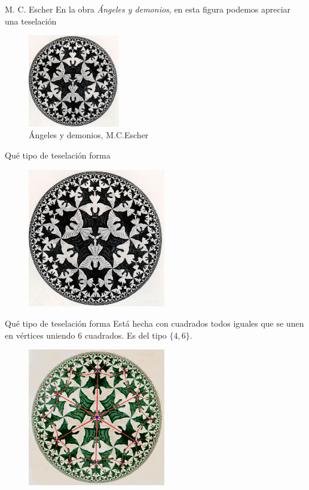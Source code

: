 \documentclass[compress]{beamer}
\begin{document}
\begin{frame}{M. C. Escher}
  En la obra \textit{Ángeles y demonios}, en esta figura podemos
  apreciar una teselación

  \begin{figure}[ht!]
    \centering
    \includegraphics[width=40mm]{./limit2.jpg}
    \caption{Ángeles y demonios, M.C.Escher  \label{angels}}
  \end{figure}
\end{frame}

\begin{frame}{Qué tipo de teselación forma}
  \begin{figure}[ht!]
    \centering
    \includegraphics[width=60mm]{./limit2.jpg}
  \end{figure}
\end{frame}

\begin{frame}{Qué tipo de teselación forma}
  Está hecha con cuadrados todos iguales que se unen en
  vértices uniendo $6$ cuadrados. Es del tipo $\{4,6\}$.
  
  \begin{figure}[ht!]
    \centering
    \includegraphics[width=60mm]{./angels.png}
  \end{figure}
\end{frame}
\end{document}
